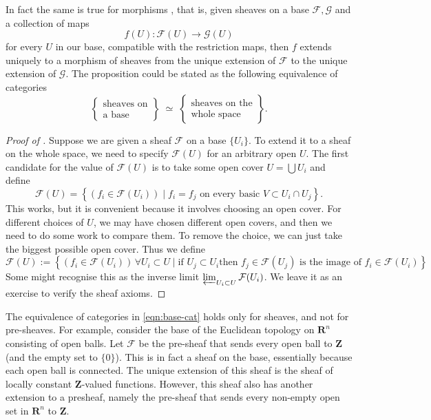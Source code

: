 In fact the same is true for morphisms , that is, given sheaves on a base $\mathcal{F}, \mathcal{G}$ and a collection of maps 
\[
f(U): \mathcal{F}(U) \to \mathcal{G}(U)
\]
for every $U$ in our base, compatible with the restriction maps, then $f$ extends uniquely to a morphism of sheaves from the unique extension of \(\mathcal{F}\) to the unique extension of \(\mathcal{G}\).
The proposition could be stated as the following equivalence of categories 
\begin{equation}\label{eqn:base-cat}
\left\{
\begin{array}{c}
\text{sheaves on}\\
\text{a base}
\end{array}
\right\}
\;\simeq\;
\left\{
\begin{array}{c}
\text{sheaves on the}\\
\text{whole space}
\end{array}
\right\}.
\end{equation}
\begin{proof}[Proof of ]
  Suppose we are given a sheaf $\mathcal{F}$ on a base $\{U_i\}$.
  To extend it to a sheaf on the whole space, we need to specify \(\mathcal{F}(U)\) for an arbitrary open \(U\).
  The first candidate for the value of $\mathcal{F}(U)$ is to take some open cover $U = \bigcup U_i$ and define
    \[
    \mathcal{F}(U) = \left\{ \left(f_i \in \mathcal F(U_i)\right) \mid f_i = f_j\text{ on every basic }V\subset U_i \cap U_j \right\}.
  \]
  This works, but it is convenient because it involves choosing an open cover.
  For different choices of \(U\), we may have chosen different open covers, and then we need to do some work to compare them.
  To remove the choice, we can just take the biggest possible open cover. Thus we define
\[
\mathcal{F}(U) := \left\{ \left(f_i \in \mathcal{F}(U_i)\right)\,\forall U_i\subset U \mid \text{if } U_j \subset U_i \text{then } f_j \in \mathcal{F}(U_j)\text{ is the image of }f_i\in\mathcal{F}(U_i) \right\}
\]
Some might recognise this as the inverse limit $\varprojlim_{\substack{U_i \subset U}} \mathcal{F}(U_i)$. We leave it as an exercise to verify the sheaf axioms.
\end{proof}

\begin{example}
  The equivalence of categories in \eqref{eqn:base-cat} holds only for sheaves, and not for pre-sheaves.
  For example, consider the base of the Euclidean topology on \(\mathbf{R}^n\) consisting of open balls.
  Let \(\mathcal{F}\) be the pre-sheaf that sends every open ball to \(\mathbf{Z}\) (and the empty set to \(\{0\}\)).
  This is in fact a sheaf on the base, essentially because each open ball is connected.
  The unique extension of this sheaf is the sheaf of locally constant \(\mathbf{Z}\)-valued functions.
  However, this sheaf also has another extension to a presheaf, namely the pre-sheaf that sends every non-empty open set in \(\mathbf{R}^n\) to \(\mathbf{Z}\).
\end{example}

